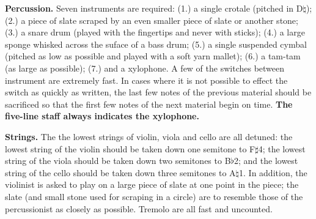 \textbf{Percussion.} Seven instruments are required: (1.) a single crotale
(pitched in D$\natural$); (2.) a piece of slate scraped by an even smaller
piece of slate or another stone; (3.) a snare drum (played with the fingertips
and never with sticks); (4.) a large sponge whisked across the suface of a bass
drum; (5.) a single suspended cymbal (pitched as low as possible and played
with a soft yarn mallet); (6.) a tam-tam (as large as possible); (7.) and a
xylophone. A few of the switches between instrument are extremely fast. In
cases where it is not possible to effect the switch as quickly as written, the
last few notes of the previous material should be sacrificed so that the first
few notes of the next material begin on time. \textbf{The five-line staff always
indicates the xylophone.}

\textbf{Strings.} The the lowest strings of violin, viola and cello are all
detuned: the lowest string of the violin should be taken down one semitone to
F$\sharp$4; the lowest string of the viola should be taken down two semitones
to B$\flat$2; and the lowest string of the cello should be taken down three
semitones to A$\natural$1. In addition, the violinist is asked to play on a
large piece of slate at one point in the piece; the slate (and small stone used
for scraping in a circle) are to resemble those of the percussionist as closely
as possible. Tremolo are all fast and uncounted.
